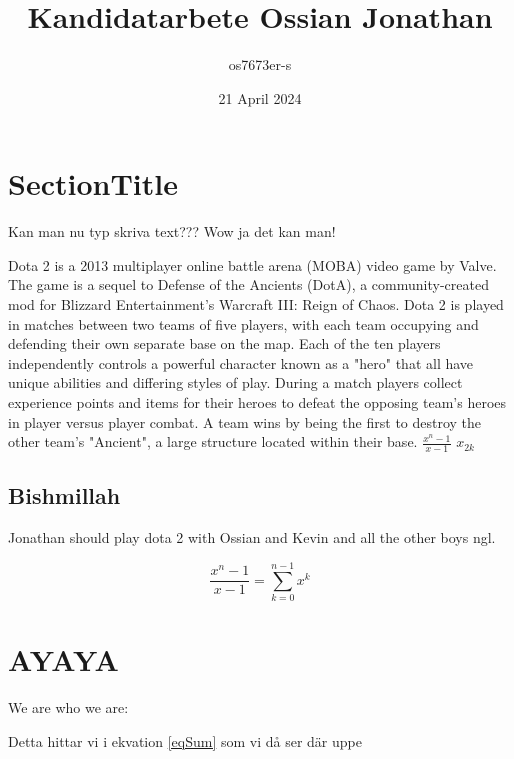 \documentclass{article} %
\title{Kandidatarbete Ossian Jonathan}
\author{os7673er-s }
\date{21 April 2024}
\begin{document}


\section{SectionTitle}
Kan man nu typ skriva text??? Wow ja det kan man!

Dota 2 is a 2013 multiplayer online battle arena (MOBA) video game by Valve. The game is a sequel to Defense of the Ancients (DotA), a community-created mod for Blizzard Entertainment's Warcraft III: Reign of Chaos. Dota 2 is played in matches between two teams of five players, with each team occupying and defending their own separate base on the map. Each of the ten players independently controls a powerful character known as a "hero" that all have unique abilities and differing styles of play. During a match players collect experience points and items for their heroes to defeat the opposing team's heroes in player versus player combat. A team wins by being the first to destroy the other team's "Ancient", a large structure located within their base.
$\frac{x^n-1}{x-1}$ %
$x_{2k}$







\subsection{Bishmillah}
Jonathan should play dota 2 with Ossian and Kevin and all the other boys ngl.

\begin{equation}
\frac{x^n-1}{x-1} = \sum_{k=0}^{n-1} x^k
\label{eqSum}
\end{equation}

\section{AYAYA} \label{poop}
We are who we are:





Detta hittar vi i ekvation \eqref{eqSum} som vi då ser där uppe
\end{document}
